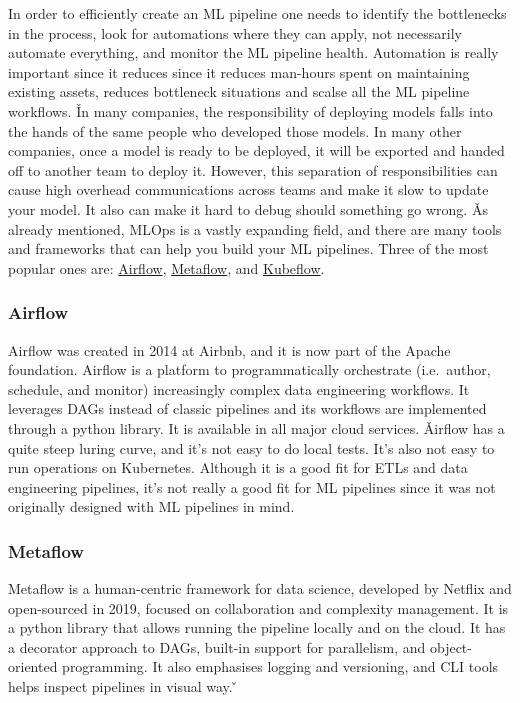 
In order to efficiently create an ML pipeline one needs to identify the bottlenecks in the process, look for
automations where they can apply, not necessarily automate everything, and monitor the ML pipeline health. Automation
is really important since it reduces since it reduces man-hours spent on maintaining existing assets, reduces
bottleneck situations and scalse all the ML pipeline workflows. \v

In many companies, the responsibility of deploying models falls into the hands of the same people who developed those
models. In many other companies, once a model is ready to be deployed, it will be exported and handed off to another
team to deploy it. However, this separation of responsibilities can cause high overhead communications across teams
and make it slow to update your model. It also can make it hard to debug should something go wrong. \v

As already mentioned, MLOps is a vastly expanding field, and there are many tools and frameworks that can help you
build your ML pipelines. Three of the most popular ones are: \href{https://airflow.apache.org/}{Airflow},
\href{https://metaflow.org/}{Metaflow}, and \href{https://www.kubeflow.org/}{Kubeflow}.

\subsubsection*{Airflow}

Airflow was created in 2014 at Airbnb, and it is now part of the Apache foundation. Airflow is a platform to
programmatically orchestrate (i.e.\ author, schedule, and monitor) increasingly complex data engineering workflows.
It leverages DAGs instead of classic pipelines and its workflows are implemented through a python library. It is
available in all major cloud services. \v

Airflow has a quite steep luring curve, and it's not easy to do local tests. It's also not easy to run operations on
Kubernetes. Although it is a good fit for ETLs and data engineering pipelines, it's not really a good fit for ML
pipelines since it was not originally designed with ML pipelines in mind.

\subsubsection*{Metaflow}

Metaflow is a human-centric framework for data science, developed by Netflix and open-sourced in 2019, focused on
collaboration and complexity management. It is a python library that allows running the pipeline locally and on the
cloud. It has a decorator approach to DAGs, built-in support for parallelism, and object-oriented programming. It
also emphasises logging and versioning, and CLI tools helps inspect pipelines in visual way. \v


